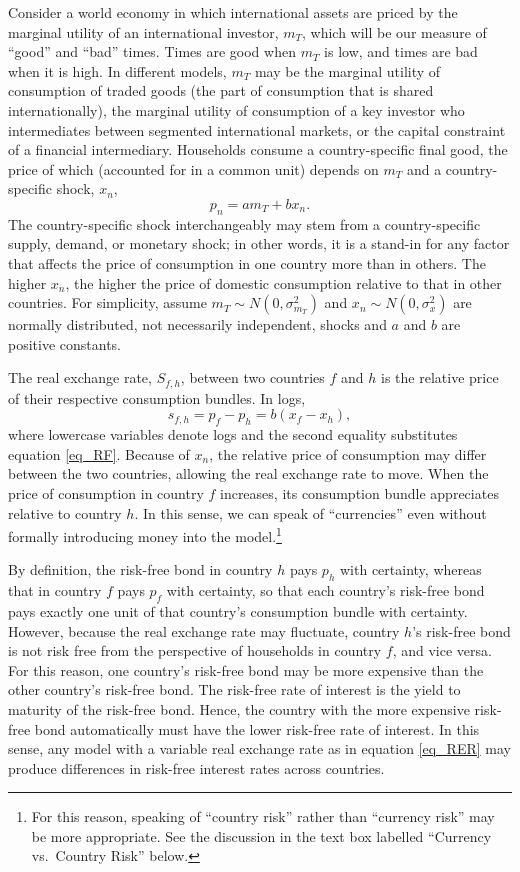 \documentclass{ar-1col}
\begin{document}
Consider a world economy in which international assets are priced by the marginal utility of an international investor, $m_T$, which will be our measure of ``good'' and ``bad'' times. Times are good when $m_T$ is low, and times are bad when it is high. In different models, $m_T$ may be the marginal utility of consumption of traded goods (the part of consumption that is shared internationally), the marginal utility of consumption of a key investor who intermediates between segmented international markets, or the capital constraint of a financial intermediary. Households consume a country-specific final good, the price of which (accounted for in a common unit) depends on $m_T$ and a country-specific shock, $x_n$,
\begin{equation}
  p_n = a m_T + b x_n.  
  \label{eq_RF}
\end{equation}%
The country-specific shock interchangeably may stem from a country-specific supply, demand, or monetary shock; in other words, it is a stand-in for any factor that affects the price of consumption in one country more than in others. The higher $x_n$, the higher the price of domestic consumption relative to that in other countries. For simplicity, assume $m_{T} \sim N(0, \sigma^2_{m_{T}})$ and $x_n \sim N(0,\sigma^2_x) $ are normally distributed, not necessarily independent, shocks and $a$ and $b$ are positive constants.

The real exchange rate, $S_{f, h}$, between two countries $f$ and $h$ is the relative price of their respective consumption bundles. In logs,
\begin{equation}
  s_{f,h} 
  = p_f - p_h 
  = b(x_f - x_h),
\label{eq_RER}
\end{equation}
where lowercase variables denote logs and the second equality substitutes equation \ref{eq_RF}. Because of $x_n$, the relative price of consumption may differ between the two countries, allowing the real exchange rate to move. When the price of consumption in country $f$ increases, its consumption bundle appreciates relative to country $h$. In this sense, we can speak of ``currencies'' even without formally introducing money into the model.\footnote{For this reason, speaking of ``country risk'' rather than ``currency risk'' may be more appropriate. See the discussion in the text box labelled ``Currency vs.~Country Risk'' below. }

By definition, the risk-free bond in country $h$ pays $p_h$ with certainty, whereas that in country $f$ pays $p_f$ with certainty, so that each country's risk-free bond pays exactly one unit of that country's consumption bundle with certainty. However, because the real exchange rate may fluctuate, country $h$'s risk-free bond is not risk free from the perspective of households in country $f$, and vice versa. For this reason, one country's risk-free bond may be more expensive than the other country's risk-free bond. The risk-free rate of interest is the yield to maturity of the risk-free bond.  Hence, the country with the more expensive risk-free bond automatically must have the lower risk-free rate of interest. In this sense, any model with a variable real exchange rate as in equation \ref{eq_RER} may produce differences in risk-free interest rates across countries.
\end{document}
